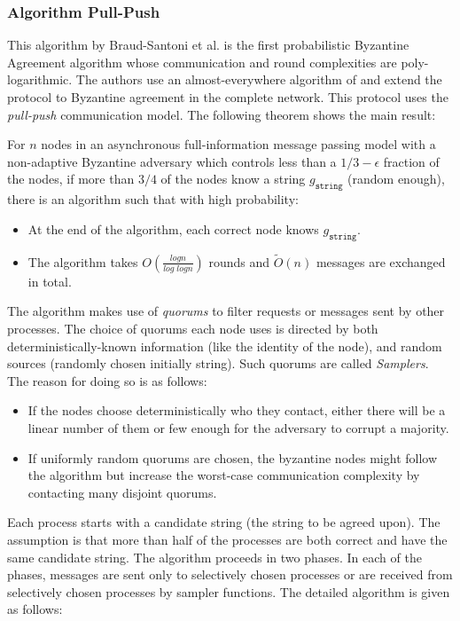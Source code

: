 \subsubsection{Algorithm Pull-Push \cite{BGH13}}
This algorithm by Braud-Santoni et al. \cite{BGH13} is the first probabilistic Byzantine Agreement algorithm whose communication and round complexities are poly-logarithmic. The authors use an almost-everywhere algorithm of \cite{KSSV06} and extend the protocol to Byzantine agreement in the complete network. This protocol uses the \textit{pull-push} communication model. The following theorem shows the main result: 


\begin{theorem}
For $n$ nodes in an asynchronous full-information message passing model with a non-adaptive Byzantine adversary which controls less than a $1/3 - \epsilon$ fraction of the nodes, if more than $3/4$ of the nodes know a string $g_{\mathtt{string}}$ (random enough), there is an algorithm such that with high probability:
\begin{itemize}
\item At the end of the algorithm, each correct node knows $g_{\mathtt{string}}$.
\item The algorithm takes $O(\frac{logn}{log \; logn})$ rounds and $\tilde{O}(n)$ messages are exchanged in total. 
\end{itemize}
\end{theorem}

The algorithm makes use of \textit{quorums} to filter requests or messages sent by other processes. The choice of quorums each node uses is directed by both deterministically-known information (like the identity of the node), and random sources (randomly chosen initially string). Such quorums are called \textit{Samplers}. The reason for doing so is as follows:
\begin{itemize}
\item If the nodes choose deterministically who they contact, either there will be a linear number of them or few enough for the adversary to corrupt a majority. 
\item If uniformly random quorums are chosen, the byzantine nodes might follow the algorithm but increase the worst-case communication complexity by contacting many disjoint quorums. 
\end{itemize}

Each process starts with a candidate string (the string to be agreed upon). The assumption is that more than half of the processes are both correct and have the same candidate string. The algorithm proceeds in two phases. In each of the phases, messages are sent only to selectively chosen processes or are received from selectively chosen processes by sampler functions. The detailed algorithm is given as follows:


